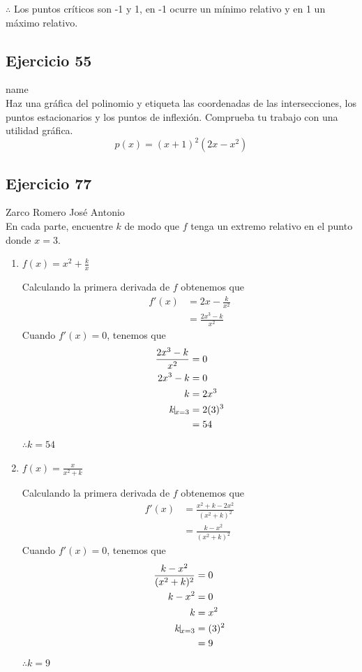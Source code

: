 \documentclass[12pt]{article}
\begin{document}
  $\therefore $ Los puntos críticos son -1 y 1, en -1 ocurre un mínimo relativo y en 1 un máximo relativo.

\subsection{Ejercicio 55} name \\

Haz una gráfica del polinomio y etiqueta las coordenadas de las intersecciones, los puntos estacionarios y los puntos de inflexión. Comprueba tu trabajo con una utilidad gráfica.
\[
p(x) = (x + 1)^2 (2x-x^2 )
\]

\subsection{Ejercicio 77} Zarco Romero José Antonio \\

En cada parte, encuentre $k$ de modo que $f$ tenga un extremo relativo en el punto donde $x = 3$.
\begin{enumerate}[label=(\alph*)]
\item $f(x)=x^2+\frac{k}{x}$

  Calculando la primera derivada de $f$ obtenemos que
  \begin{align*}
    f'(x)
    &= 2x-\frac{k}{x^2} \\
    &= \frac{2x^3-k}{x^2}
  \end{align*}
  Cuando $f'(x)=0$, tenemos que
  \begin{align*}
    \frac{2x^3-k}{x^2}
    &=0\\
    2x^3-k
    &=0\\
    k
    &=2x^3\\
    k\vline_{x=3}
    &= 2(3)^3\\
    &=54
  \end{align*}
  $\therefore k=54$

\item $f(x)=\frac{x}{x^2+k}$
  

  Calculando la primera derivada de $f$ obtenemos que
  \begin{align*}
    f'(x)
    &= \frac{x^2+k-2x^2}{(x^2+k)^2}\\
    &= \frac{k-x^2}{(x^2+k)^2}
  \end{align*}
  Cuando $f'(x)=0$, tenemos que
  \begin{align*}
    \frac{k-x^2}{(x^2+k)^2}
    &=0\\
    k-x^2
    &=0\\
    k
    &=x^2\\
    k\vline_{x=3}
    &= (3)^2\\
    &=9
  \end{align*}
  $\therefore k=9$
\end{enumerate}
\end{document}
